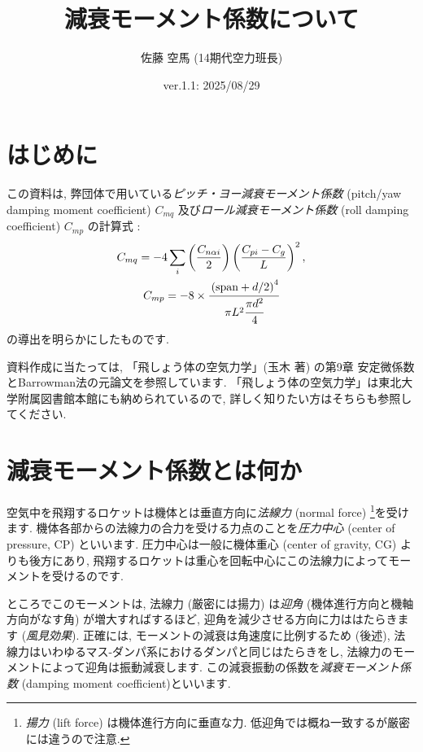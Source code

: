 \documentclass[uplatex,dvipdfmx,a4j,11  pt]{jsarticle}
\title{減衰モーメント係数について}
\date{
  ver.1.1: 2025/08/29
}
\author{佐藤 空馬 (14期代空力班長)}
\begin{document}
\maketitle
\thispagestyle{mypagestyle}%
\setcounter{section}{-1}
\section{はじめに}
この資料は, 弊団体で用いている\emph{ピッチ・ヨー減衰モーメント係数} (pitch/yaw damping moment coefficient) $C_{mq}$ 及び\emph{ロール減衰モーメント係数} (roll damping coefficient) $C_{mp}$ の計算式 : 
\begin{gather}
  C_{mq} = - 4 \sum_i \left(\frac{C_{n\alpha i}}{2}\right)\left(\frac{C_{pi} - C_{g}}{L}\right)^2,\label{pitch_damping_coef}\\
  C_{mp} = - 8 \times \cfrac{\left(\mathrm{span} + d/2\right)^4}{\pi L^2 \cfrac{\pi d^2}{4}} \label{roll_damping_coef}
\end{gather}
の導出を明らかにしたものです.

資料作成に当たっては, 「飛しょう体の空気力学」(玉木 著) \cite{aerodynamics}の第9章 安定微係数とBarrowman法の元論文\cite{barrowman}を参照しています.
「飛しょう体の空気力学」は東北大学附属図書館本館にも納められているので, 詳しく知りたい方はそちらも参照してください.

\section{減衰モーメント係数とは何か}
空気中を飛翔するロケットは機体とは垂直方向に\emph{法線力} (normal force) \footnote{\emph{揚力} (lift force) は機体進行方向に垂直な力. 低迎角では概ね一致するが厳密には違うので注意.}を受けます.
機体各部からの法線力の合力を受ける力点のことを\emph{圧力中心} (center of pressure, CP) といいます.
圧力中心は一般に機体重心 (center of gravity, CG) よりも後方にあり, 飛翔するロケットは重心を回転中心にこの法線力によってモーメントを受けるのです.

ところでこのモーメントは, 法線力 (厳密には揚力) は\emph{迎角} (機体進行方向と機軸方向がなす角) が増大すればするほど, 迎角を減少させる方向に力ははたらきます (\emph{風見効果}).
正確には, モーメントの減衰は角速度に比例するため (後述), 法線力はいわゆるマス-ダンパ系におけるダンパと同じはたらきをし, 法線力のモーメントによって迎角は振動減衰します.
この減衰振動の係数を\emph{減衰モーメント係数} (damping moment coefficient)といいます.
\end{document}
